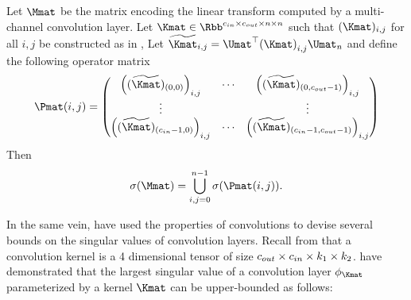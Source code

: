 \begin{theorem}
  Let $\Mmat$ be the matrix encoding the linear transform computed by a multi-channel convolution layer.
  Let $\Kmat \in \Rbb^{\cin \times \cout \times n \times n}$ such that $(\Kmat)_{i,j}$ for all $i,j$ be constructed as in , 
  Let $\widetilde{\Kmat}_{i,j} = \Umat^\top \leftmat \Kmat \rightmat_{i,j} \Umat_n $ and define the following operator matrix 
  \begin{equation}
    \Pmat(i,j) = \leftmatrix 
    \leftmat (\widetilde{\Kmat})_{(0,0)} \rightmat_{i, j} & \cdots & \leftmat (\widetilde{\Kmat})_{(0, \cout-1)} \rightmat_{i, j} \\
    \vdots & & \vdots \\
    \leftmat (\widetilde{\Kmat})_{(\cin-1, 0)} \rightmat_{i, j} & \cdots & \leftmat (\widetilde{\Kmat})_{(\cin-1, \cout-1)} \rightmat_{i, j}
    \rightmatrix
  \end{equation}
  Then
  \begin{equation}
    \sigma(\Mmat) = \bigcup_{i, j = 0}^{n-1} \sigma \left(  \Pmat(i,j) \right).
  \end{equation}
  \removespace
\end{theorem}





In the same vein, \citet{singla2019bounding} have used the properties of convolutions to devise several bounds on the singular values of convolution layers.
Recall from  that a convolution kernel is a 4 dimensional tensor of size $c_{out} \times c_{in} \times k_1 \times k_2$.
\citet{singla2019bounding} have demonstrated that the largest singular value of a convolution layer $\layer_\Kmat$ parameterized by a kernel $\Kmat$ can be upper-bounded as follows:

